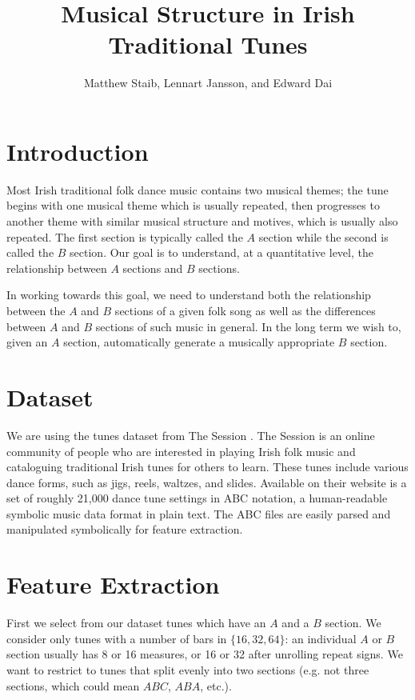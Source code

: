 \documentclass{article} %
\title{Musical Structure in Irish Traditional Tunes}
\author{Matthew Staib, Lennart Jansson, and Edward Dai}
\begin{document}
\maketitle

\section{Introduction}
Most Irish traditional folk dance music contains two musical themes; the tune
begins with one musical theme which is usually repeated, then progresses to
another theme with similar musical structure and motives, which is usually also
repeated. The first section is typically called the $A$ section while the second
is called the $B$ section. Our goal is to understand, at a quantitative level,
the relationship between $A$ sections and $B$ sections.

In working towards this goal, we need to understand both the relationship
between the $A$ and $B$ sections of a given folk song as well as the differences
between $A$ and $B$ sections of such music in general. In the long term we wish
to, given an $A$ section, automatically generate a musically appropriate $B$
section.

\section{Dataset}

We are using the tunes dataset from The Session \cite{thesession}. The
Session is an online community of people who are interested in playing Irish
folk music and cataloguing traditional Irish tunes for others to learn. These
tunes include various dance forms, such as jigs, reels, waltzes, and slides.
Available on their website is a set of roughly 21,000 dance tune settings
in ABC notation, a human-readable symbolic music data format in plain text. The
ABC files are easily parsed and manipulated symbolically for feature extraction.

\section{Feature Extraction}

First we select from our dataset tunes which have an $A$ and a $B$ section. We
consider only tunes with a number of bars in $\{16, 32, 64\}$: an individual $A$
or $B$ section usually has 8 or 16 measures, or 16 or 32 after unrolling repeat
signs. We want to restrict to tunes that split evenly into two sections (e.g.
not three sections, which could mean $ABC$, $ABA$, etc.).
\end{document}
